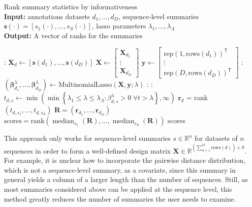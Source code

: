 \documentclass{article}
\newcommand{\median}{\operatorname{median}}
\begin{document}
\begin{algorithm}
    \caption{Rank summary statistics by informativeness\\
        \textbf{Input:} annotations datasets $d_1, \dotsc, d_D$, sequence-level summaries $\mathbf s(\cdot) = [s_1(\cdot), \dotsc, s_S(\cdot)]$, lasso parameters $\lambda_1, \dotsc, \lambda_\Lambda$ \\
        \textbf{Output:} A vector of ranks for the summaries }
    \label{alg:Lasso}
    \begin{algorithmic}
   		:
			\State $\mathbf X_d \gets [\mathbf s(d_1), \dotsc, \mathbf s(d_D)]$
    	\EndFor
		\State $\mathbf X \gets \begin{bmatrix}
			 \mathbf X_{d_1} \\ \vdots \\ \mathbf X_{d_D} 
			 \end{bmatrix}$
		\State $\mathbf y \gets \begin{bmatrix}
			\text{rep}(1, \text{rows}(d_1))^\mathsf{T}
			\\ \vdots \\
			\text{rep}(D, \text{rows}(d_D))^\mathsf{T}
		\end{bmatrix}$
        :
        	\State $(\boldsymbol \beta_{d_1}^\lambda, \dotsc, \boldsymbol \beta_{d_D}^\lambda) \gets \text{MultinomialLasso}(\mathbf X, \mathbf y; \lambda)$
        \EndFor
        :
        	:
				\State $t_{d, s} \gets 
				\min\left( \min \left\{ \lambda_1 \le \lambda \le \lambda_\Lambda: \beta_{d, s}^\lambda > 0 \; 
					\forall t > \lambda \right\},
					\infty \right)$
			\EndFor
			\State $\mathbf r_d$ = rank$(t_{d, s_1}, \dotsc, t_{d, s_S})$
        \EndFor
        \State $\mathbf R = (\mathbf r_{d_1}, \dotsc, \mathbf r_{d_D})$
        \State $\text{scores} = \text{rank}\left( \median_{s_1}(\mathbf R),
        	 \dotsc, \median_{s_S}(\mathbf R) \right)$
       \State \Return scores
    \end{algorithmic}
\end{algorithm}

This approach only works for sequence-level summaries $s \in \mathbb{R}^n$ for datasets of $n$ sequences in order to form a well-defined design matrix $\mathbf X \in \mathbb{R}^{\left(\sum_{d=1}^D \text{rows}(d) \right) \times S}$.
For example, it is unclear how to incorporate the pairwise distance distribution, which is not a sequence-level summary, as a covariate, since this summary in general yields a column of a larger length than the number of sequences. 
Still, as most summaries considered above can be applied at the sequence level, this method greatly reduces the number of summaries the user needs to examine.
\end{document}
